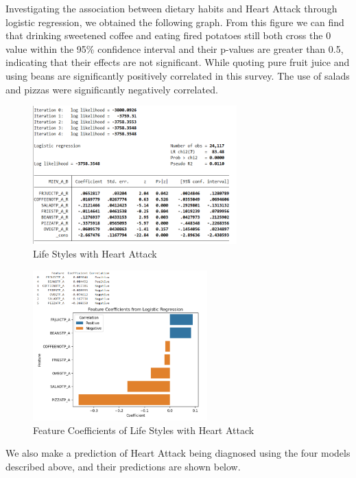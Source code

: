 \documentclass{article}
\begin{document}
Investigating the association between dietary habits and Heart Attack through logistic regression, we obtained the following graph. From this figure we can find that drinking sweetened coffee and eating fired potatoes still both cross the 0 value within the 95\% confidence interval and their p-values are greater than 0.5, indicating that their effects are not significant. While quoting pure fruit juice and using beans are significantly positively correlated in this survey. The use of salads and pizzas were significantly negatively correlated.
\newpage
\begin{figure}[!h]
	\centering
	\includegraphics[width=0.7\textwidth]{../Image/L_M.jpg}
	\caption{Life Styles with Heart Attack}
	\label{fig:G7}
\end{figure}

\begin{figure}[!h]
	\centering
	\includegraphics[width=0.6\textwidth]{../Image/P24.jpg}
	\caption{Feature Coefficients of Life Styles with Heart Attack}
	\label{fig:P24}
\end{figure}

We also make a prediction of Heart Attack being diagnosed using the four models described above, and their predictions are shown below.
\end{document}
